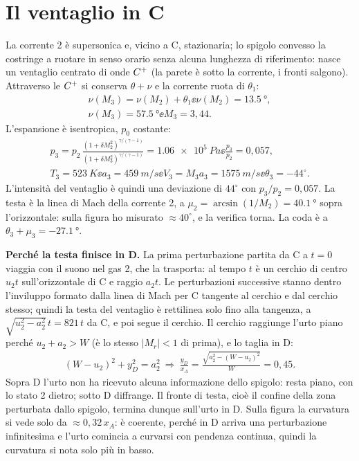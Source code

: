 \section*{Il ventaglio in C}
La corrente 2 è supersonica e, vicino a C, stazionaria; lo spigolo convesso la costringe a ruotare in senso orario
senza alcuna lunghezza di riferimento: nasce un ventaglio centrato di onde $C^{+}$ (la parete è sotto la corrente, i
fronti salgono). Attraverso le $C^{+}$ si conserva $\theta+\nu$ e la corrente ruota di $\theta_1$:
\begin{gather*}
  \nu(M_3)=\nu(M_2)+\theta_1 \ee \nu(M_2)=\SI{13.5}{\degree},\\
  \nu(M_3)=\SI{57.5}{\degree} \ee M_3=3{,}44 .
\end{gather*}
L'espansione è isentropica, $p_0$ costante:
\begin{gather*}
  p_3=p_2\,\frac{(1+\delta M_2^2)^{\gamma/(\gamma-1)}}{(1+\delta M_3^2)^{\gamma/(\gamma-1)}}=\SI{1.06e5}{Pa} \ee
  \frac{p_3}{p_2}=0{,}057,\\
  T_3=\SI{523}{K} \ee a_3=\SI{459}{m/s} \ee V_3=M_3a_3=\SI{1575}{m/s} \ee \theta_3=-44^\circ .
\end{gather*}
L'intensità del ventaglio è quindi una deviazione di $44^\circ$ con $p_3/p_2=0{,}057$. La testa è la linea di Mach
della corrente 2, a $\mu_2=\arcsin(1/M_2)=\SI{40.1}{\degree}$ sopra l'orizzontale: sulla figura ho misurato
$\approx40^\circ$, e la verifica torna. La coda è a $\theta_3+\mu_3=\SI{-27.1}{\degree}$.

\textbf{Perché la testa finisce in D.} La prima perturbazione partita da C a $t=0$ viaggia con il suono nel gas 2,
che la trasporta: al tempo $t$ è un cerchio di centro $u_2t$ sull'orizzontale di C e raggio $a_2t$. Le perturbazioni
successive stanno dentro l'inviluppo formato dalla linea di Mach per C tangente al cerchio e dal cerchio stesso;
quindi la testa del ventaglio è rettilinea solo fino alla tangenza, a $\sqrt{u_2^2-a_2^2}\,t=821\,t$ da C, e poi
segue il cerchio. Il cerchio raggiunge l'urto piano perché $u_2+a_2>W$ (è lo stesso $|M_r|<1$ di prima), e lo taglia
in D:
\begin{gather*}
  (W-u_2)^2+y_D^2=a_2^2 \ \Rightarrow\ \frac{y_D}{x_A}=\frac{\sqrt{a_2^2-(W-u_2)^2}}{W}=0{,}45 .
\end{gather*}
Sopra D l'urto non ha ricevuto alcuna informazione dello spigolo: resta piano, con lo stato 2 dietro; sotto D
diffrange. Il fronte di testa, cioè il confine della zona perturbata dallo spigolo, termina dunque sull'urto in D.
Sulla figura la curvatura si vede solo da $\approx0{,}32\,x_A$: è coerente, perché in D arriva una perturbazione
infinitesima e l'urto comincia a curvarsi con pendenza continua, quindi la curvatura si nota solo più in basso.

